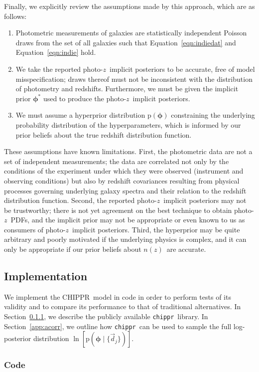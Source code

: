 \documentclass[iop]{emulateapj}
\newcommand{\Sect}[1]{Section~\ref{#1}}
\newcommand{\Eq}[1]{Equation~\ref{#1}}
\newcommand{\project}[1]{\textsc{#1}}
\newcommand{\Chippr}{\project{CHIPPR}}%
\newcommand{\repo}[1]{\texttt{#1}}
\newcommand{\chippr}{\repo{chippr}}
\newcommand{\data}{\ensuremath{\vec{d}}}%
\newcommand{\pr}[1]{\ensuremath{\mathrm{p}(#1)}}%
\newcommand{\gvn}{\mid}%
\newcommand{\pz}{photo-$z$}
\newcommand{\pzpdf}{\pz\ PDF}%
\newcommand{\pzip}{\pz\ implicit posterior}
\newcommand{\nz}{$n(z)$}
\newcommand{\bvec}[1]{\ensuremath{\boldsymbol{#1}}}%
\newcommand{\ndphi}{\bvec{\phi}}
\begin{document}
Finally, we explicitly review the assumptions made by this approach, which are as follows:
\begin{enumerate}
	\item Photometric measurements of galaxies are statistically independent Poisson draws from the set of all galaxies such that \Eq{eqn:indiedat} and \Eq{eqn:indie} hold.
	\item We take the reported \pzip s to be accurate, free of model misspecification; draws thereof must not be inconsistent with the distribution of photometry and redshifts.
	Furthermore, we must be given the implicit prior $\ndphi^{*}$ used to produce the \pzip s.
	\item We must assume a hyperprior distribution $\pr{\ndphi}$ constraining the underlying probability distribution of the hyperparameters, which is informed by our prior beliefs about the true redshift distribution function.
\end{enumerate}

These assumptions have known limitations.  
First, the photometric data are not a set of independent measurements; the data are correlated not only by the conditions of the experiment under which they were observed (instrument and observing conditions) but also by redshift covariances resulting from physical processes governing underlying galaxy spectra and their relation to the redshift distribution function.
Second, the reported \pzip s may not be trustworthy; there is not yet agreement on the best technique to obtain \pzpdf s, and the implicit prior may not be appropriate or even known to us as consumers of \pzip s.  
Third, the hyperprior may be quite arbitrary and poorly motivated if the underlying physics is complex, and it can only be appropriate if our prior beliefs about \nz\ are accurate.

\subsection{Implementation}
\label{sec:exp}

We implement the \Chippr\ model in code in order to perform tests of its validity and to compare its performance to that of traditional alternatives.
In \Sect{sec:mcmc}, we describe the publicly available \chippr\ library.
In \Sect{app:acorr}, we outline how \chippr\ can be used to sample the full log-posterior distribution $\ln[\pr{\ndphi \gvn \{\data_{j}\}}]$.

\subsubsection{Code}
\label{sec:mcmc}
\end{document}
